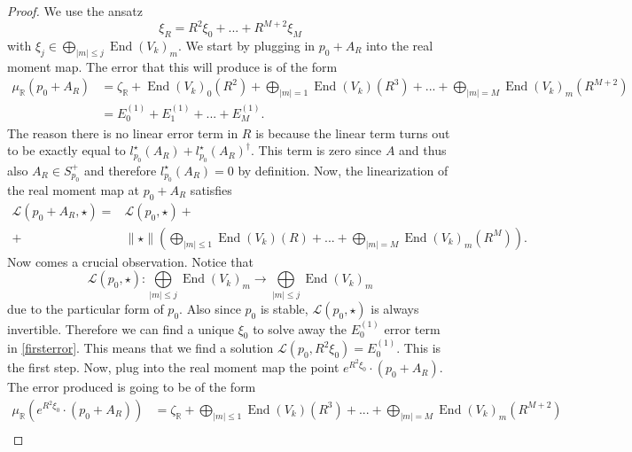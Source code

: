 \documentclass[12pt,oneside,reqno]{amsart}
\theoremstyle{definition}
\numberwithin{equation}{section}
\numberwithin{theorem}{section}
\newcommand{\R}{\mathbb{R}}
\newcommand{\End}{\operatorname{End}}
\begin{document}
%
\begin{proof}
We use the ansatz 
%
\begin{equation}
\xi_R = R^2\xi_0 + ... +R^{M+2}\xi_{M}
\end{equation}
%
with $\xi_j \in \bigoplus\limits_{|m|\le j}\End(V_k)_m$. We start by plugging in $p_0+A_R$ into the real moment map. The error that this will produce is of the form 
%
\begin{equation}\label{firsterror}
\begin{split}
\mu_{\R}(p_0+A_R) &= \zeta_{\R} + \End(V_k)_0(R^2) + \bigoplus\limits_{|m|= 1}\End(V_k)(R^3)+ ... + \bigoplus\limits_{|m|= M} \End(V_k)_m(R^{M+2})\\
&= E_0^{(1)}+E_1^{(1)}+...+ E_M^{(1)}.
\end{split}
\end{equation}
%
The reason there is no linear error term in $R$ is because the linear term turns out to be exactly equal to $l_{p_0}^{\star}(A_R) + l_{p_0}^{\star}(A_R)^{\dagger}$. This term is zero since $A$ and thus also  $A_R\in S^+_{p_0}$ and therefore $l_{p_0}^{\star}(A_R) =0$ by definition. Now, the linearization of the real moment map at $p_0+A_R$ satisfies 
%
\begin{equation}
\begin{split}
\mathcal L(p_0+A_R,\star) = &\mathcal L(p_0,\star ) +\\+& \|\star\|\left(\bigoplus\limits_{|m|\le 1}\End(V_k)(R)+ ... + \bigoplus\limits_{|m|= M} \End(V_k)_m(R^{M})\right).
\end{split}
\end{equation}
%
Now comes a crucial observation. Notice that 
%
\begin{equation}\label{gradingpreserving}
\mathcal L(p_0,\star): \bigoplus\limits_{|m|\le j}\End(V_k)_m \to \bigoplus\limits_{|m|\le j}\End(V_k)_m
\end{equation}
%
due to the particular form of $p_0$. Also since $p_0$ is stable, $\mathcal L(p_0,\star)$ is always invertible. Therefore we can find a unique $\xi_0$ to solve away the $E_0^{(1)}$ error term in \eqref{firsterror}. This means that we find a solution $\mathcal L(p_0,R^2\xi_0) = E_0^{(1)}$. This is the first step. Now, plug into the real moment map the point $e^{R^2\xi_0}\cdot(p_0+A_R)$. The error produced is going to be of the form 
%
\begin{equation}\label{seconderror}
\begin{split}
\mu_{\R}(e^{R^2\xi_0}\cdot(p_0+A_R)) &= \zeta_{\R} + \bigoplus\limits_{|m|\le 1}\End(V_k)(R^3)+ ... + \bigoplus\limits_{|m|= M} \End(V_k)_m(R^{M+2})\\

\end{split}
\end{equation}
\end{proof}
\end{document}
